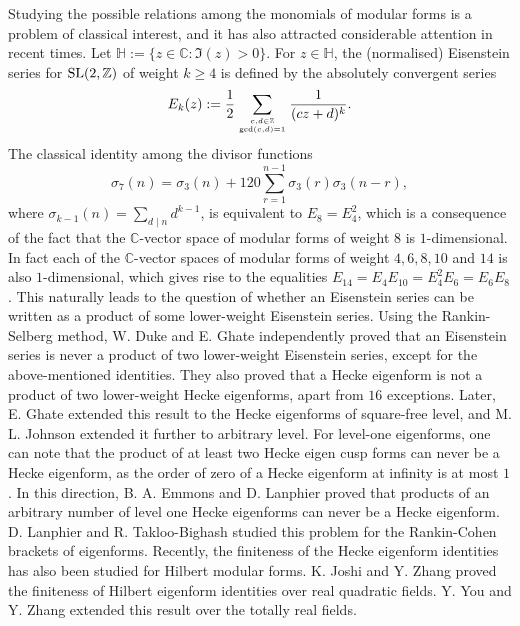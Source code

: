 \documentclass[12pt,reqno]{amsart}
\newcommand{\Z}{{\mathbb Z}}
\newcommand{\C}{{\mathbb C}}
\newcommand{\uH}{{\mathbb H}}
\begin{document}
Studying the possible relations among the monomials of modular forms is a problem of classical interest, and it has also attracted considerable attention in recent times. Let $\uH:=\{z\in\C: \Im(z)>0\}$. For $z\in \uH$, the (normalised) Eisenstein series for ${\rm SL}(2,\Z)$ of weight $k\ge 4$ is defined by the absolutely convergent series
$$
E_k(z):=\frac{1}{2}\sum_{c,d\in\Z \atop \gcd(c,d)=1} \frac{1}{(cz+d)^k}.
$$
The classical identity among the divisor functions
$$
\sigma_7(n)=\sigma_3(n)+120\sum_{r=1}^{n-1}\sigma_3(r)\sigma_3(n-r),
$$
where $\sigma_{k-1}(n)=\sum_{d\mid n}d^{k-1}$, is equivalent to $E_8=E_4^2$, which is a consequence of the 
fact that the $\C$-vector space of modular forms of weight $8$ is $1$-dimensional. In fact each of the $\C$-vector spaces of modular forms of weight $4,6,8,10$ and $14$ is also $1$-dimensional, which gives rise to the equalities $E_{14}=E_4 E_{10}= E_4^2 E_6= E_6 E_8$. This naturally leads to the question of whether an Eisenstein series can be written as a product of some lower-weight Eisenstein series. Using the Rankin-Selberg method, W. Duke \cite{WD} and E. Ghate \cite{EG} independently proved that an Eisenstein series is never a product of two lower-weight Eisenstein series, except for the above-mentioned identities. They also proved that a Hecke eigenform is not a product of two lower-weight Hecke eigenforms, apart 
from $16$ exceptions. Later, E. Ghate \cite{EG2} extended this result to the Hecke eigenforms of square-free level, and M. L. Johnson \cite{J} extended it further 
to arbitrary level. For level-one eigenforms, one can note that the product of at least two Hecke eigen cusp forms can never be a Hecke eigenform, as the order of 
zero of a Hecke eigenform at infinity is at most $1$. In this direction, B. A. Emmons and D. Lanphier \cite{EL} proved that products of an arbitrary number of level one Hecke eigenforms can never be a Hecke eigenform.  D. Lanphier and R. Takloo-Bighash \cite{LT} studied this problem for the Rankin-Cohen brackets of eigenforms. Recently, the finiteness of the Hecke eigenform identities has also been studied for Hilbert modular forms. K. Joshi and Y. Zhang \cite{JZ} proved the finiteness of Hilbert eigenform identities over real quadratic fields. Y. You and Y. Zhang \cite{YZ} extended this result over the totally real fields.
\end{document}
